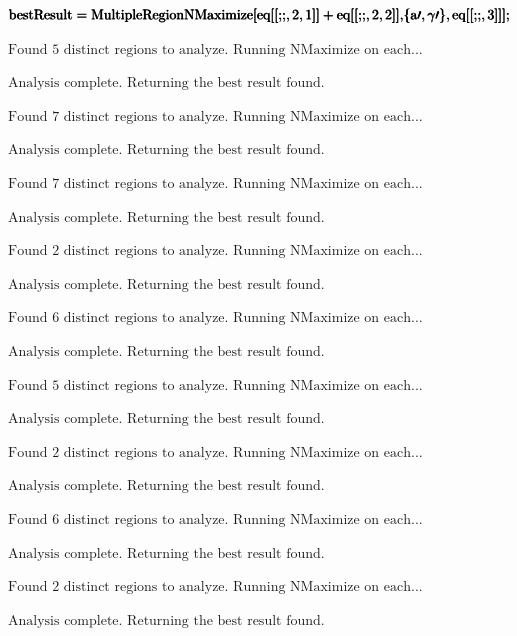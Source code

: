 \documentclass{article}
\begin{document}
\begin{doublespace}
\noindent\(\pmb{\text{bestResult} = \text{MultipleRegionNMaximize}[\text{eq}[[\text{;;},2,1]]+\text{eq}[[\text{;;},2,2]],}\\
\pmb{\{\text{a$\prime $},\gamma \prime \},\text{eq}[[\text{;;},3]]];}\)
\end{doublespace}

\noindent\(\text{Found }5\text{ distinct regions to analyze. Running NMaximize on each...}\)

\noindent\(\text{Analysis complete. Returning the best result found.}\)

\noindent\(\text{Found }7\text{ distinct regions to analyze. Running NMaximize on each...}\)

\noindent\(\text{Analysis complete. Returning the best result found.}\)

\noindent\(\text{Found }7\text{ distinct regions to analyze. Running NMaximize on each...}\)

\noindent\(\text{Analysis complete. Returning the best result found.}\)

\noindent\(\text{Found }2\text{ distinct regions to analyze. Running NMaximize on each...}\)

\noindent\(\text{Analysis complete. Returning the best result found.}\)

\noindent\(\text{Found }6\text{ distinct regions to analyze. Running NMaximize on each...}\)

\noindent\(\text{Analysis complete. Returning the best result found.}\)

\noindent\(\text{Found }5\text{ distinct regions to analyze. Running NMaximize on each...}\)

\noindent\(\text{Analysis complete. Returning the best result found.}\)

\noindent\(\text{Found }2\text{ distinct regions to analyze. Running NMaximize on each...}\)

\noindent\(\text{Analysis complete. Returning the best result found.}\)

\noindent\(\text{Found }6\text{ distinct regions to analyze. Running NMaximize on each...}\)

\noindent\(\text{Analysis complete. Returning the best result found.}\)

\noindent\(\text{Found }2\text{ distinct regions to analyze. Running NMaximize on each...}\)

\noindent\(\text{Analysis complete. Returning the best result found.}\)
\end{document}
